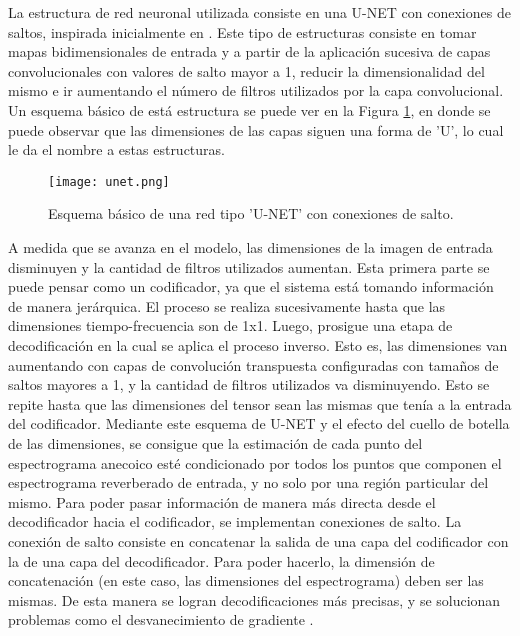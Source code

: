 La estructura de red neuronal utilizada consiste en una U-NET con conexiones de saltos, inspirada inicialmente en \cite{FCN}. Este tipo de estructuras consiste en tomar mapas bidimensionales de entrada y a partir de la aplicación sucesiva de capas convolucionales con valores de salto mayor a 1, reducir la dimensionalidad del mismo e ir aumentando el número de filtros utilizados por la capa convolucional. Un esquema básico de está estructura se puede ver en la Figura \ref{fig:unet}, en donde se puede observar que las dimensiones de las capas siguen una forma de 'U', lo cual le da el nombre a estas estructuras.

\begin{figure}[H]
	\centering{}
	\texttt{[image: unet.png]}
	\caption{Esquema básico de una red tipo 'U-NET' con conexiones de salto.}
	\label{fig:unet}
\end{figure}

A medida que se avanza en el modelo, las dimensiones de la imagen de entrada disminuyen y la cantidad de filtros utilizados aumentan. Esta primera parte se puede pensar como un codificador, ya que el sistema está tomando información de manera jerárquica.  El proceso se realiza sucesivamente hasta que las dimensiones tiempo-frecuencia son de 1x1. Luego, prosigue una etapa de decodificación en la cual se aplica el proceso inverso. Esto es, las dimensiones van aumentando con capas de convolución transpuesta configuradas con tamaños de saltos mayores a 1, y la cantidad de filtros utilizados va disminuyendo. Esto se repite hasta que las dimensiones del tensor sean las mismas que tenía a la entrada del codificador. Mediante este esquema de U-NET y el efecto del cuello de botella de las dimensiones, se consigue que la estimación de cada punto del espectrograma anecoico esté condicionado por todos los puntos que componen el espectrograma reverberado de entrada, y no solo por una región particular del mismo. Para poder pasar información de manera más directa desde el decodificador hacia el codificador, se implementan conexiones de salto. La conexión de salto consiste en concatenar la salida de una capa del codificador con la de una capa del decodificador. Para poder hacerlo, la dimensión de concatenación (en este caso, las dimensiones del espectrograma) deben ser las mismas. De esta manera se logran decodificaciones más precisas, y se solucionan problemas como el desvanecimiento de gradiente \cite{lagartija}. 

